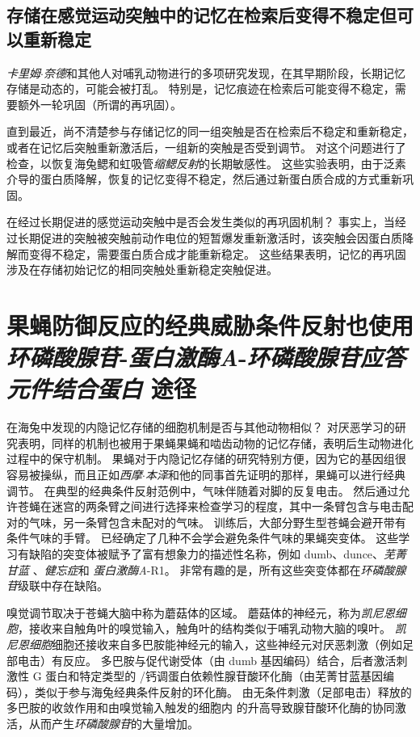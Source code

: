 \subsection{存储在感觉运动突触中的记忆在检索后变得不稳定但可以重新稳定}

\textit{卡里姆$\cdot$奈德}和其他人对哺乳动物进行的多项研究发现，在其早期阶段，长期记忆存储是动态的，可能会被打乱。
特别是，记忆痕迹在检索后可能变得不稳定，需要额外一轮巩固（所谓的再巩固）。


直到最近，尚不清楚参与存储记忆的同一组突触是否在检索后不稳定和重新稳定，或者在记忆后突触重新激活后，一组新的突触是否受到调节。
对这个问题进行了检查，以恢复海兔鳃和虹吸管\textit{缩鳃反射}的长期敏感性。
这些实验表明，由于泛素介导的蛋白质降解，恢复的记忆变得不稳定，然后通过新蛋白质合成的方式重新巩固。


在经过长期促进的感觉运动突触中是否会发生类似的再巩固机制？
事实上，当经过长期促进的突触被突触前动作电位的短暂爆发重新激活时，该突触会因蛋白质降解而变得不稳定，需要蛋白质合成才能重新稳定。
这些结果表明，记忆的再巩固涉及在存储初始记忆的相同突触处重新稳定突触促进。



\section{果蝇防御反应的经典威胁条件反射也使用\textit{环磷酸腺苷}-\textit{蛋白激酶A}-\textit{环磷酸腺苷应答元件结合蛋白} 途径}

在海兔中发现的内隐记忆存储的细胞机制是否与其他动物相似？
对厌恶学习的研究表明，同样的机制也被用于果蝇果蝇和啮齿动物的记忆存储，表明后生动物进化过程中的保守机制。
果蝇对于内隐记忆存储的研究特别方便，因为它的基因组很容易被操纵，而且正如\textit{西摩$\cdot$本泽}和他的同事首先证明的那样，果蝇可以进行经典调节。
在典型的经典条件反射范例中，气味伴随着对脚的反复电击。
然后通过允许苍蝇在迷宫的两条臂之间进行选择来检查学习的程度，其中一条臂包含与电击配对的气味，另一条臂包含未配对的气味。
训练后，大部分野生型苍蝇会避开带有条件气味的手臂。
已经确定了几种不会学会避免条件气味的果蝇突变体。
这些学习有缺陷的突变体被赋予了富有想象力的描述性名称，例如 dumb、dunce、\textit{芜菁甘蓝
}、\textit{健忘症}和 \textit{蛋白激酶A}-R1。
非常有趣的是，所有这些突变体都在\textit{环磷酸腺苷}级联中存在缺陷。


嗅觉调节取决于苍蝇大脑中称为蘑菇体的区域。
蘑菇体的神经元，称为\textit{凯尼恩细胞}，接收来自触角叶的嗅觉输入，触角叶的结构类似于哺乳动物大脑的嗅叶。
\textit{凯尼恩细胞}细胞还接收来自多巴胺能神经元的输入，这些神经元对厌恶刺激（例如足部电击）有反应。
多巴胺与促代谢受体（由 dumb 基因编码）结合，后者激活刺激性 G 蛋白和特定类型的 /钙调蛋白依赖性腺苷酸环化酶（由芜菁甘蓝基因编码），类似于参与海兔经典条件反射的环化酶。
由无条件刺激（足部电击）释放的多巴胺的收敛作用和由嗅觉输入触发的细胞内  的升高导致腺苷酸环化酶的协同激活，从而产生\textit{环磷酸腺苷}的大量增加。


